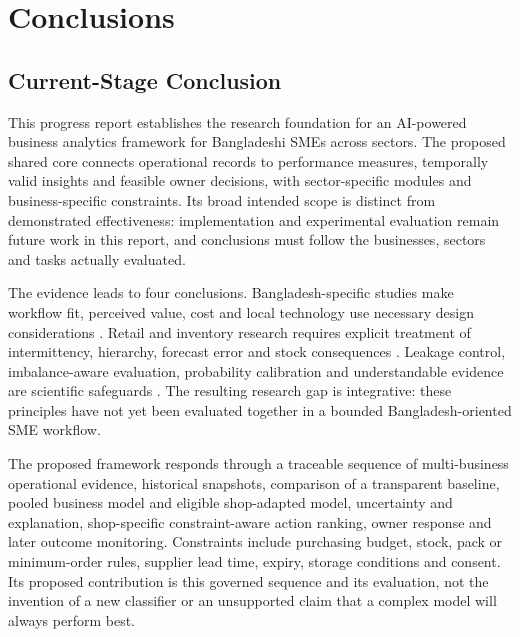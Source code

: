 \chapter{Conclusions}
\label{chapter_conclusion}

\section{Current-Stage Conclusion}

This progress report establishes the research foundation for an
AI-powered business analytics framework for Bangladeshi SMEs across sectors.
The proposed shared core connects operational records to performance measures,
temporally valid insights and feasible owner decisions, with sector-specific
modules and business-specific constraints. Its broad intended scope is distinct
from demonstrated effectiveness: implementation and experimental evaluation
remain future work in this report, and conclusions must follow the businesses,
sectors and tasks actually evaluated.

The evidence leads to four conclusions. Bangladesh-specific studies make
workflow fit, perceived value, cost and local technology use necessary design
considerations \cite{hoque2016ict,shahadat2023digital,hazra2021mfs}. Retail and
inventory research requires explicit treatment of intermittency, hierarchy,
forecast error and stock consequences
\cite{fildes2022retail,syntetos2005intermittent,hyndman2011hierarchical,
syntetos2010stock}. Leakage control, imbalance-aware evaluation, probability
calibration and understandable evidence are scientific safeguards
\cite{kaufman2012leakage,saito2015pr,niculescu2005calibration,lundberg2017shap}.
The resulting research gap is integrative: these principles have not yet been
evaluated together in a bounded Bangladesh-oriented SME workflow.

The proposed \system{} framework responds through a traceable sequence of
multi-business operational evidence, historical snapshots, comparison of a
transparent baseline, pooled business model and eligible shop-adapted model,
uncertainty and explanation, shop-specific constraint-aware action ranking,
owner response and later outcome monitoring. Constraints include purchasing
budget, stock, pack or minimum-order rules, supplier lead time, expiry, storage
conditions and consent. Its proposed contribution is this
governed sequence and its evaluation, not the invention of a new classifier or
an unsupported claim that a complex model will always perform best.

